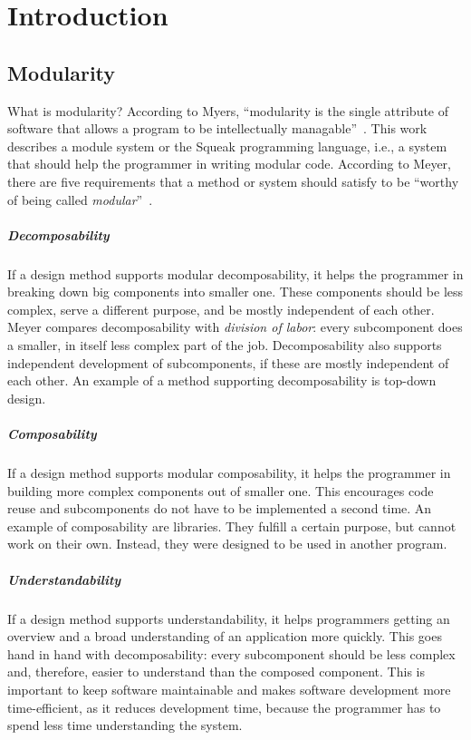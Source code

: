 \chapter{Introduction}

\section{Modularity}
What is modularity? According to Myers, ``modularity is the single attribute of software that allows a program to be intellectually managable''~\cite{myers1978composite}. This work describes a module system or the Squeak programming language, i.e., a system that should help the programmer in writing modular code. According to Meyer, there are five requirements that a method or system should satisfy to be ``worthy of being called \emph{modular}''~\cite{Meyer:1988:OSC:534929}.

\paragraph{Decomposability}
If a design method supports modular decomposability, it helps the programmer in breaking down big components into smaller one. These components should be less complex, serve a different purpose, and be mostly independent of each other. Meyer compares decomposability with \emph{division of labor}: every subcomponent does a smaller, in itself less complex part of the job. Decomposability also supports independent development of subcomponents, if these are mostly independent of each other. An example of a method supporting decomposability is top-down design.

\paragraph{Composability}
If a design method supports modular composability, it helps the programmer in building more complex components out of smaller one. This encourages code reuse and subcomponents do not have to be implemented a second time. An example of composability are libraries. They fulfill a certain purpose, but cannot work on their own. Instead, they were designed to be used in another program.

\paragraph{Understandability}
If a design method supports understandability, it helps programmers getting an overview and a broad understanding of an application more quickly. This goes hand in hand with decomposability: every subcomponent should be less complex and, therefore, easier to understand than the composed component. This is important to keep software maintainable and makes software development more time-efficient, as it reduces development time, because the programmer has to spend less time understanding the system.

